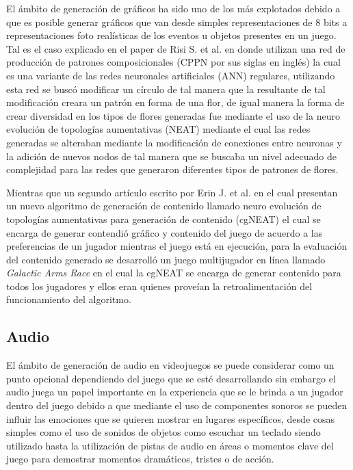 El ámbito de generación de gráficos ha sido uno de los más explotados debido a
que es posible generar gráficos que van desde simples representaciones de 8 bits a
representaciones foto realísticas de los eventos u objetos presentes en un
juego. Tal es el caso explicado en el paper de Risi S. et al.\cite{Risi2012} en
donde utilizan una red de producción de patrones composicionales (CPPN por sus
siglas en inglés) la cual es una variante de las redes neuronales artificiales
(ANN) regulares, utilizando esta red se buscó modificar un círculo de tal manera
que la resultante de tal modificación creara un patrón en forma de una flor, de
igual manera la forma de crear diversidad en los tipos de flores generadas fue
mediante el uso de la neuro evolución de topologías aumentativas (NEAT) mediante
el cual las redes generadas se alteraban mediante la modificación de conexiones
entre neuronas y la adición de nuevos nodos de tal manera que se buscaba un
nivel adecuado de complejidad para las redes que generaron diferentes tipos de
patrones de flores.

Mientras que un segundo artículo escrito por Erin J. et al.\cite{Hastings2009} en
el cual presentan un nuevo algoritmo de generación de contenido llamado
neuro evolución de topologías aumentativas para generación de contenido (cgNEAT)
el cual se encarga de generar contendió gráfico y contenido del juego de acuerdo
a las preferencias de un jugador mientras el juego está en ejecución, para la
evaluación del contenido generado se desarrolló un juego multijugador en línea
llamado \textit{Galactic Arms Race} en el cual la cgNEAT se encarga de generar
contenido para todos los jugadores y ellos eran quienes proveían la
retroalimentación del funcionamiento del algoritmo.

\subsection{Audio}
\label{subsection:Audio}

El ámbito de generación de audio en videojuegos se puede considerar como un
punto opcional dependiendo del juego que se esté desarrollando sin embargo el
audio juega un papel importante en la experiencia que se le brinda a un jugador
dentro del juego debido a que mediante el uso de componentes sonoros se pueden
influir las emociones que se quieren mostrar en lugares específicos, desde cosas
simples como el uso de sonidos de objetos como escuchar un teclado siendo
utilizado hasta la utilización de pistas de audio en áreas o momentos clave del
juego para demostrar momentos dramáticos, tristes o de acción. 

